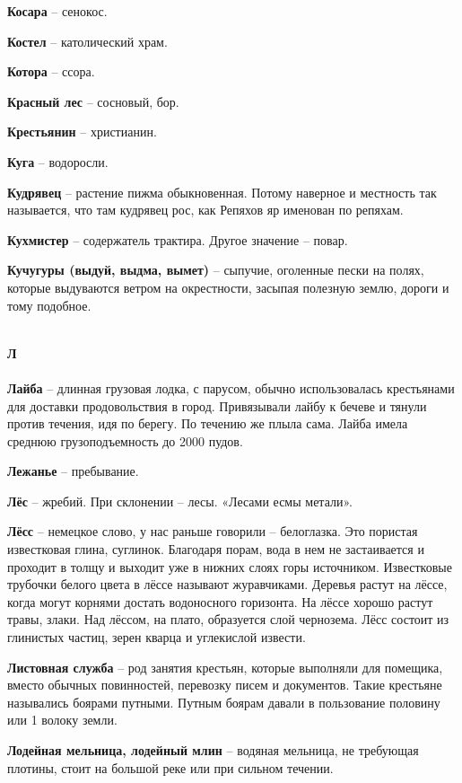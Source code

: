 \begin{multicols}{2}
\textbf{Косара} – сенокос.

\textbf{Костел} – католический храм.

\textbf{Котора} – ссора.

\textbf{Красный лес} – сосновый, бор.

\textbf{Крестьянин} – христианин.

\textbf{Куга} – водоросли.

\textbf{Кудрявец} – растение пижма обыкновенная. Потому наверное и местность так называется, что там кудрявец рос, как Репяхов яр именован по репяхам.

\textbf{Кухмистер} – содержатель трактира. Другое значение – повар.

\textbf{Кучугуры (выдуй, выдма, вымет)} – сыпучие, оголенные пески на полях, которые выдуваются ветром на окрестности, засыпая полезную землю, дороги и тому подобное. 

\mbox{ }\\
\textbf{Л\\}
\mbox{ }\\

\textbf{Лайба} – длинная грузовая лодка, с парусом, обычно использовалась крестьянами для доставки продовольствия в город. Привязывали лайбу к бечеве и тянули против течения, идя по берегу. По течению же плыла сама. Лайба имела среднюю грузоподъемность до 2000 пудов.

\textbf{Лежанье} – пребывание.

\textbf{Лёс} – жребий. При склонении – лесы. «Лесами есмы метали».

\textbf{Лёсс} – немецкое слово, у нас раньше говорили – белоглазка. Это пористая известковая глина, суглинок. Благодаря порам, вода в нем не застаивается и проходит в толщу и выходит уже в нижних слоях горы источником. Известковые трубочки белого цвета в лёссе называют журавчиками. Деревья растут на лёссе, когда могут корнями достать водоносного горизонта. На лёссе хорошо растут травы, злаки. Над лёссом, на плато, образуется слой чернозема. Лёсс состоит из глинистых частиц, зерен кварца и углекислой извести.

\textbf{Листовная служба} – род занятия крестьян, которые выполняли для помещика, вместо обычных повинностей, перевозку писем и документов. Такие крестьяне назывались боярами путными. Путным боярам давали в пользование половину или 1 волоку земли.

\textbf{Лодейная мельница, лодейный млин} – водяная мельница, не требующая плотины, стоит на большой реке или при сильном течении.


\end{multicols}

